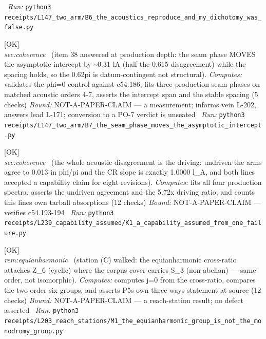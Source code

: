 \begin{description}
\ \emph{Run:} \texttt{python3 receipts/L147\_two\_arm/B6\_the\_acoustics\_reproduce\_and\_my\_dichotomy\_was\_false.py}
\item[\label{rcpt:B7_the_seam_phase_moves_the_asymptotic_intercept}\texttt{B7\_the\_seam\_phase\_moves\_the\_asymptotic\_intercept}]\hfill\textsf{[OK]}\\
\textit{sec:coherence} \ (item 38 answered at production depth: the seam phase MOVES the asymptotic intercept by \textasciitilde{}0.31 lA (half the 0.615 disagreement) while the spacing holds, so the 0.62pi is datum-contingent not structural). 
\emph{Computes:} validates the phi=0 control against c54.186, fits three production seam phases on matched acoustic orders 4-7, asserts the intercept span and the stable spacing (5 checks)
 \emph{Bound:} NOT-A-PAPER-CLAIM --- a measurement; informs vein L-202, answers lead L-171; conversion to a PO-7 verdict is unseated
\ \emph{Run:} \texttt{python3 receipts/L147\_two\_arm/B7\_the\_seam\_phase\_moves\_the\_asymptotic\_intercept.py}
\item[\label{rcpt:K1_a_capability_assumed_from_one_failure}\texttt{K1\_a\_capability\_assumed\_from\_one\_failure}]\hfill\textsf{[OK]}\\
\textit{sec:coherence} \ (the whole acoustic disagreement is the driving: undriven the arms agree to 0.013 in phi/pi and the CR slope is exactly 1.0000 l\_A, and both lines accepted a capability claim for eight revisions). 
\emph{Computes:} fits all four production spectra, asserts the undriven agreement and the 5.72x driving ratio, and counts this lines own tarball absorptions (12 checks)
 \emph{Bound:} NOT-A-PAPER-CLAIM --- verifies c54.193-194
\ \emph{Run:} \texttt{python3 receipts/L239\_capability\_assumed/K1\_a\_capability\_assumed\_from\_one\_failure.py}
\item[\label{rcpt:M1_the_equianharmonic_group_is_not_the_monodromy_group}\texttt{M1\_the\_equianharmonic\_group\_is\_not\_the\_monodromy\_group}]\hfill\textsf{[OK]}\\
\textit{rem:equianharmonic} \ (station (C) walked: the equianharmonic cross-ratio attaches Z\_6 (cyclic) where the corpus cover carries S\_3 (non-abelian) --- same order, not isomorphic). 
\emph{Computes:} computes j=0 from the cross-ratio, compares the two order-six groups, and asserts P5s own three-ways statement at source (12 checks)
 \emph{Bound:} NOT-A-PAPER-CLAIM --- a reach-station result; no defect asserted
\ \emph{Run:} \texttt{python3 receipts/L203\_reach\_stations/M1\_the\_equianharmonic\_group\_is\_not\_the\_monodromy\_group.py}

\end{description}
